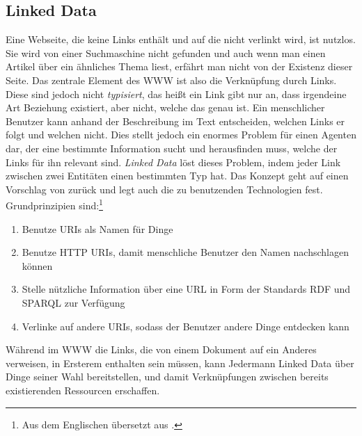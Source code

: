 \subsection{Linked Data}
Eine Webseite, die keine Links enthält und auf die nicht verlinkt wird, ist nutzlos.
Sie wird von einer Suchmaschine nicht gefunden und auch wenn man einen Artikel über ein ähnliches Thema liest, erfährt man nicht von der Existenz dieser Seite.
Das zentrale Element des WWW ist also die Verknüpfung durch Links. Diese sind jedoch nicht \textit{typisiert}, das heißt ein Link gibt nur an, dass irgendeine Art Beziehung existiert, aber nicht, welche das genau ist.
Ein menschlicher Benutzer kann anhand der Beschreibung im Text entscheiden, welchen Links er folgt und welchen nicht. 
Dies stellt jedoch ein enormes Problem für einen Agenten dar, der eine bestimmte Information sucht und herausfinden muss, welche der Links für ihn relevant sind.
\emph{Linked Data} löst dieses Problem, indem jeder Link zwischen zwei Entitäten einen bestimmten Typ hat.
Das Konzept geht auf einen Vorschlag von \citet{www-linked-data-proposal} zurück und legt auch die zu benutzenden Technologien fest.
Grundprinzipien sind:\footnote{Aus dem Englischen übersetzt aus \cite{www-linked-data-proposal}.}
\begin{enumerate}
\item{Benutze URIs als Namen für Dinge}
\item{Benutze HTTP URIs, damit menschliche Benutzer den Namen nachschlagen können}
\item{Stelle nützliche Information über eine URL in Form der Standards RDF und SPARQL zur Verfügung}
\item{Verlinke auf andere URIs, sodass der Benutzer andere Dinge entdecken kann}
\end{enumerate}
Während im WWW die Links, die von einem Dokument auf ein Anderes verweisen, in Ersterem enthalten sein müssen, kann Jedermann Linked Data über Dinge seiner Wahl bereitstellen,
und damit Verknüpfungen zwischen bereits existierenden Ressourcen erschaffen.

